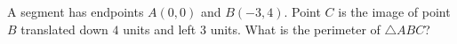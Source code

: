 A segment has endpoints $A(0,0)$ and $B(-3,4)$. Point $C$ is the image of point $B$ translated down $4$ units and left $3$ units. What is the perimeter of $\triangle ABC$?
